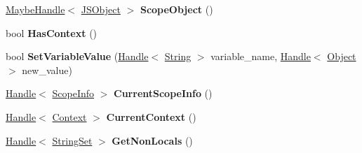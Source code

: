 \begin{DoxyCompactItemize}
\item 
\hyperlink{classv8_1_1internal_1_1_maybe_handle}{Maybe\+Handle}$<$ \hyperlink{classv8_1_1internal_1_1_j_s_object}{J\+S\+Object} $>$ {\bfseries Scope\+Object} ()\hypertarget{classv8_1_1internal_1_1_scope_iterator_a9d1d8d624ff19e8721ad009d365da8c6}{}\label{classv8_1_1internal_1_1_scope_iterator_a9d1d8d624ff19e8721ad009d365da8c6}

\item 
bool {\bfseries Has\+Context} ()\hypertarget{classv8_1_1internal_1_1_scope_iterator_a407467acd91156f9972a89e17c190217}{}\label{classv8_1_1internal_1_1_scope_iterator_a407467acd91156f9972a89e17c190217}

\item 
bool {\bfseries Set\+Variable\+Value} (\hyperlink{classv8_1_1internal_1_1_handle}{Handle}$<$ \hyperlink{classv8_1_1internal_1_1_string}{String} $>$ variable\+\_\+name, \hyperlink{classv8_1_1internal_1_1_handle}{Handle}$<$ \hyperlink{classv8_1_1internal_1_1_object}{Object} $>$ new\+\_\+value)\hypertarget{classv8_1_1internal_1_1_scope_iterator_a75b041ba4a4d017daea66327308f52fb}{}\label{classv8_1_1internal_1_1_scope_iterator_a75b041ba4a4d017daea66327308f52fb}

\item 
\hyperlink{classv8_1_1internal_1_1_handle}{Handle}$<$ \hyperlink{classv8_1_1internal_1_1_scope_info}{Scope\+Info} $>$ {\bfseries Current\+Scope\+Info} ()\hypertarget{classv8_1_1internal_1_1_scope_iterator_a8b739ad08303f77bf5971e5f13c280f8}{}\label{classv8_1_1internal_1_1_scope_iterator_a8b739ad08303f77bf5971e5f13c280f8}

\item 
\hyperlink{classv8_1_1internal_1_1_handle}{Handle}$<$ \hyperlink{classv8_1_1internal_1_1_context}{Context} $>$ {\bfseries Current\+Context} ()\hypertarget{classv8_1_1internal_1_1_scope_iterator_a55775b3410cb21a455e1e2050e6ab799}{}\label{classv8_1_1internal_1_1_scope_iterator_a55775b3410cb21a455e1e2050e6ab799}

\item 
\hyperlink{classv8_1_1internal_1_1_handle}{Handle}$<$ \hyperlink{classv8_1_1internal_1_1_string_set}{String\+Set} $>$ {\bfseries Get\+Non\+Locals} ()\hypertarget{classv8_1_1internal_1_1_scope_iterator_a21b06d8bae4b550e6ab8e40e8d4df03a}{}\label{classv8_1_1internal_1_1_scope_iterator_a21b06d8bae4b550e6ab8e40e8d4df03a}

\end{DoxyCompactItemize}
